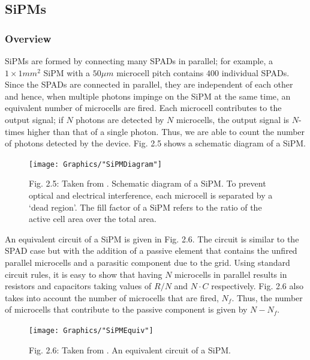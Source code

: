 \subsection{SiPMs}

\subsubsection{Overview}

SiPMs are formed by connecting many SPADs in parallel; for example, a $1\times 1 mm^2$ SiPM with a $50\mu m$ microcell pitch contains $400$ individual SPADs. Since the SPADs are connected in parallel, they are independent of each other and hence, when multiple photons impinge on the SiPM at the same time, an equivalent number of microcells are fired. Each microcell contributes to the output signal; if $N$ photons are detected by $N$ microcells, the output signal is $N$-times higher than that of a single photon.  Thus, we are able to count the number of photons detected by the device. Fig. 2.5 shows a schematic diagram of a SiPM.

\begin{figure}[h]
  \texttt{[image: Graphics/"SiPMDiagram"]}
  {\caption*{Fig. 2.5: Taken from \cite{renker2006}. Schematic diagram of a SiPM. To prevent optical and electrical interference, each microcell is separated by a `dead region'. The fill factor of a SiPM refers to the ratio of the active cell area over the total area.}}
\end{figure}

\noindent An equivalent circuit of a SiPM is given in Fig. 2.6. The circuit is similar to the SPAD case but with the addition of a passive element that contains the unfired parallel microcells and a parasitic component due to the grid. \cite{gundacker2020} Using standard circuit rules, it is easy to show that having $N$ microcells in parallel results in resistors and capacitors taking values of $R/N$ and $N\cdot C$ respectively. Fig. 2.6 also takes into account the number of microcells that are fired, $N_f$. Thus, the number of microcells that contribute to the passive component is given by $N-N_f$.

\begin{figure}[h]
\texttt{[image: Graphics/"SiPMEquiv"]}
  {\caption*{Fig. 2.6: Taken from \cite{gundacker2020}. An equivalent circuit of a SiPM.}}
\end{figure}

